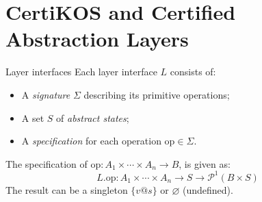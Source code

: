 \documentclass{beamer}
\newcommand{\kw}[1]{\ensuremath{ \mathrm{#1} }}
\begin{document}
%
%
%


\section*{CertiKOS and Certified Abstraction Layers} %

\begin{frame}{Layer interfaces} %
  Each layer interface $L$ consists of:
  \begin{itemize}
    \item
      A \emph{signature} $\Sigma$ describing its primitive operations;
    \item
      A set $S$ of \emph{abstract states};
    \item
      A \emph{specification} for each operation $\kw{op} \in \Sigma$.
  \end{itemize}

  The specification of
  $\kw{op} : A_1 \times \cdots \times A_n \rightarrow B$,
  is given as:
  \[
    L.\kw{op} :
      A_1 \times \cdots \times A_n \rightarrow
      S \rightarrow \mathcal{P}^1(B \times S)
  \]
  The result can be a singleton $\{v@s\}$
  or $\varnothing$ (undefined).
\end{frame}
\end{document}
